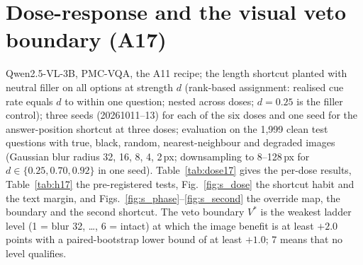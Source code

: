 
\section{Dose-response and the visual veto boundary (A17)}
\label{app:dose17}

Qwen2.5-VL-3B, PMC-VQA, the A11 recipe; the length shortcut planted with neutral filler on all options at strength $d$ (rank-based assignment: realised cue rate equals $d$ to within one question; nested across doses; $d=0.25$ is the filler control); three seeds (20261011--13) for each of the six doses and one seed for the answer-position shortcut at three doses; evaluation on the 1{,}999 clean test questions with true, black, random, nearest-neighbour and degraded images (Gaussian blur radius 32, 16, 8, 4, 2\,px; downsampling to 8--128\,px for $d\in\{0.25,0.70,0.92\}$ in one seed).
Table~\ref{tab:dose17} gives the per-dose results, Table~\ref{tab:h17} the pre-registered tests, Fig.~\ref{fig:s_dose} the shortcut habit and the text margin, and Figs.~\ref{fig:s_phase}--\ref{fig:s_second} the override map, the boundary and the second shortcut.
The veto boundary $V^\ast$ is the weakest ladder level (1 = blur 32, \dots, 6 = intact) at which the image benefit is at least $+2.0$ points with a paired-bootstrap lower bound of at least $+1.0$; 7 means that no level qualifies.

\begin{table}[h]
  \centering
  \footnotesize
  \setlength{\tabcolsep}{4pt}
  \caption{\textbf{Shortcut dose-response (A17; three seeds, Qwen2.5-VL-3B, PMC-VQA E1).} $g$(intact): image benefit of the intact image (points); $V^\ast$: veto boundary by seed; shortest pick: share of predictions equal to the shortest option; median $M_T$: median black-image log-odds margin; accuracies on the matched (planted) test; cue-free acc.: accuracy on the original, unplanted options; override: share of intact-image predictions that differ from the black-image answer.}
  \label{tab:dose17}
\end{table}

